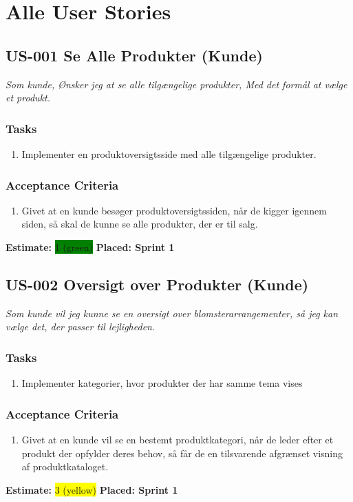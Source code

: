 \section{Alle User Stories}
\label{sec:all-user-stories}

\subsection{US-001 Se Alle Produkter (Kunde)}
\label{sec:US-001}
\textit{Som kunde, Ønsker jeg at se alle tilgængelige produkter, Med det formål at vælge et produkt.}
\subsubsection*{\textbf{Tasks}}
\begin{enumerate}
  \item Implementer en produktoversigtsside med alle tilgængelige produkter.
\end{enumerate}
\subsubsection*{\textbf{Acceptance Criteria}}
\begin{enumerate}
  \item Givet at en kunde besøger produktoversigtssiden, når de kigger igennem siden, så skal de kunne se alle produkter, der er til salg.
\end{enumerate}
\textbf{Estimate:} \colorbox{green}{1 (green)}
\textbf{Placed: Sprint 1}
\par\noindent\dotfill

\subsection{US-002 Oversigt over Produkter (Kunde)}
\label{sec:US-002}
\textit{Som kunde vil jeg kunne se en oversigt over blomsterarrangementer, så jeg kan vælge det, der passer til lejligheden.}
\subsubsection*{\textbf{Tasks}}
\begin{enumerate}
  \item Implementer kategorier, hvor produkter der har samme tema vises
\end{enumerate}
\subsubsection*{\textbf{Acceptance Criteria}}
\begin{enumerate}
  \item Givet at en kunde vil se en bestemt produktkategori, når de leder efter et produkt der opfylder deres behov, så får de en tilsvarende afgrænset visning af produktkataloget.
\end{enumerate}
\textbf{Estimate:} \colorbox{yellow}{3 (yellow)}
\textbf{Placed: Sprint 1}
\par\noindent\dotfill

